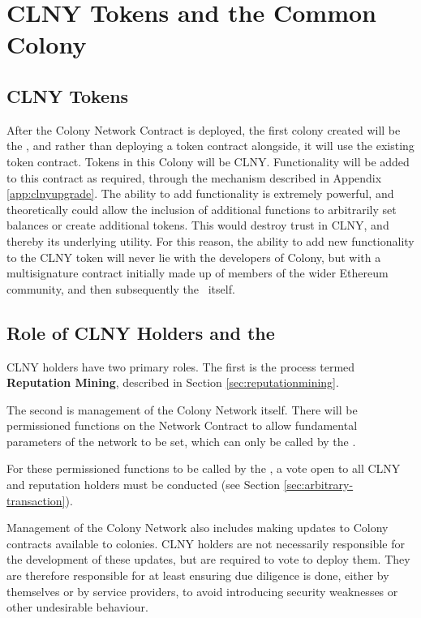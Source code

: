 \section{CLNY Tokens and the Common Colony}\label{sec:clny}

\subsection{CLNY Tokens}
 
After the Colony Network Contract is deployed, the first colony created will be the \rc, and rather than deploying a token contract alongside, it will use the existing token contract. Tokens in this Colony will be CLNY. Functionality will be added to this contract as required, through the  mechanism described in Appendix \ref{app:clnyupgrade}. The ability to add functionality is extremely powerful, and theoretically could allow the inclusion of additional functions to arbitrarily set balances or create additional tokens. This would destroy trust in CLNY, and thereby its underlying utility. For this reason, the ability to add new functionality to the CLNY token will never lie with the developers of Colony, but with a multisignature contract initially made up of members of the wider Ethereum community, and then subsequently the \rc\ itself.

\subsection{Role of CLNY Holders and the \rc}
CLNY holders have two primary roles. The first is the process termed \textbf{Reputation Mining}, described in Section \ref{sec:reputationmining}.

The second is management of the Colony Network itself. There will be permissioned functions on the Network Contract to allow fundamental parameters of the network to be set, which can only be called by the \rc.

For these permissioned functions to be called by the \rc, a vote open to all CLNY and reputation holders must be conducted  (see Section \ref{sec:arbitrary-transaction}).

Management of the Colony Network also includes making updates to Colony contracts available to colonies. CLNY holders are not necessarily responsible for the development of these updates, but are required to vote to deploy them. They are therefore responsible for at least ensuring due diligence is done, either by themselves or by service providers, to avoid introducing security weaknesses or other undesirable behaviour.


